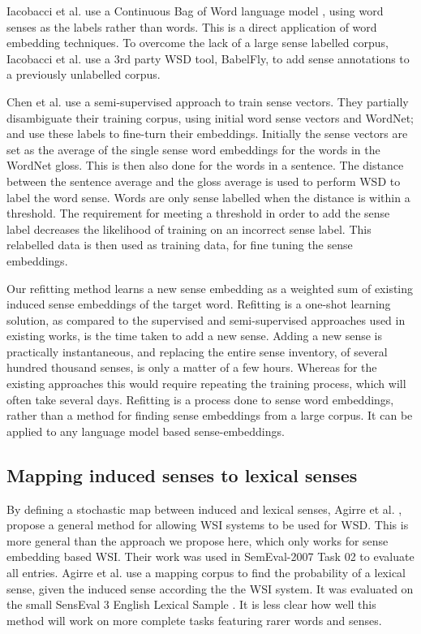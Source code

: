 \documentclass{article}
\def\parencite{\cite}
\begin{document}
Iacobacci et al.  use a Continuous Bag of Word language model \parencite{mikolov2013efficient}, using word senses as the labels rather than words. This is a direct application of word embedding techniques. To overcome the lack of a large sense labelled corpus, Iacobacci et al. use a 3rd party WSD tool, BabelFly, to add sense annotations to a previously unlabelled corpus.

Chen et al.  use a semi-supervised approach to train sense vectors. They partially disambiguate their training corpus, using initial word sense vectors and WordNet; and use these labels to fine-turn their embeddings.
Initially the sense vectors are set as the average of the single sense word embeddings \parencite{mikolov2013efficient} for the words in the WordNet gloss. This is then also done for the words in a sentence. The distance between the sentence average and the gloss average is used to perform WSD to label the word sense. Words are only sense labelled when the distance is within a threshold. The requirement for meeting a threshold in order to add the sense label  decreases the likelihood of training on an incorrect sense label.
This relabelled data is then used as training data, for fine tuning the sense embeddings.


Our refitting method learns a new sense embedding as a weighted sum of existing induced sense embeddings of the target word.
Refitting is a one-shot learning solution, as compared to the supervised and semi-supervised approaches used in existing works, is the time taken to  add a new sense.
Adding a new sense is practically instantaneous, and replacing the entire sense inventory, of several hundred thousand senses, is only a matter of a few hours.
Whereas for the existing approaches this would require repeating the training process, which will often take several days.
Refitting is a process done to sense word embeddings, rather than a method for finding sense embeddings from a large corpus. 
It can be applied to any language model based sense-embeddings.


\subsection{Mapping induced senses to lexical senses}\label{mapping}
By defining a stochastic map between induced and lexical senses, Agirre et al. , propose a general method for allowing WSI systems to be used for WSD. This is more general than the approach we propose here, which only works for sense embedding based WSI. 
Their work was used in SemEval-2007 Task 02 \parencite{SemEval2007WSIandWSD} to evaluate all entries. 
Agirre et al. use a mapping corpus to find the probability of a lexical sense, given the induced sense according the the WSI system.
It was evaluated on the small SensEval 3 English Lexical Sample \parencite{mihalcea2004senseval}. It is less clear how well this method will work on more complete tasks featuring rarer words and senses. 
\end{document}
